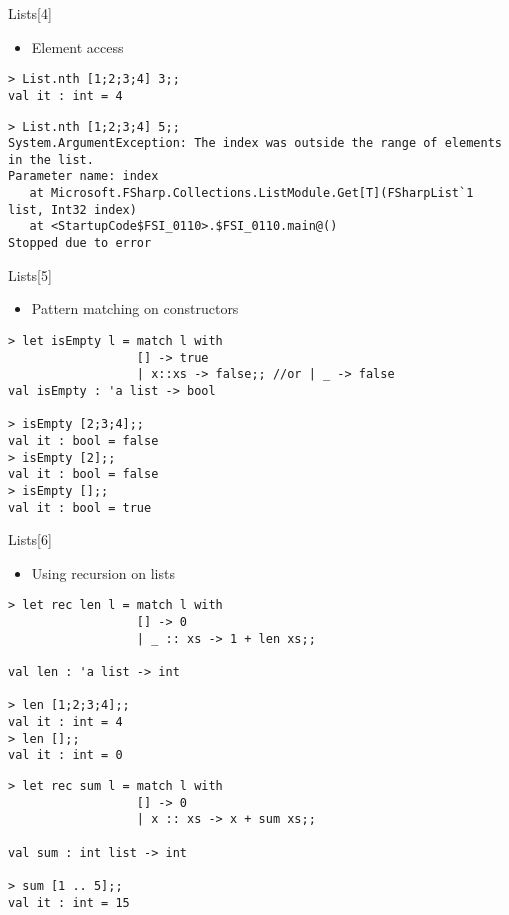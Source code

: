 \documentclass{beamer}
\begin{document}
\begin{frame}[fragile]{Lists[4]}
  \begin{itemize}
    \item Element access
  \end{itemize}
\tiny{
  \begin{verbatim}
> List.nth [1;2;3;4] 3;;
val it : int = 4
  \end{verbatim}
  \pause
  \begin{verbatim}
> List.nth [1;2;3;4] 5;;
System.ArgumentException: The index was outside the range of elements in the list.
Parameter name: index
   at Microsoft.FSharp.Collections.ListModule.Get[T](FSharpList`1 list, Int32 index)
   at <StartupCode$FSI_0110>.$FSI_0110.main@()
Stopped due to error
  \end{verbatim}
}
\end{frame}

\begin{frame}[fragile]{Lists[5]}
  \begin{itemize}
    \item Pattern matching on constructors
  \end{itemize}
  \tiny{
  \begin{verbatim}
> let isEmpty l = match l with
                  [] -> true
                  | x::xs -> false;; //or | _ -> false
val isEmpty : 'a list -> bool

> isEmpty [2;3;4];;
val it : bool = false
> isEmpty [2];;
val it : bool = false
> isEmpty [];;
val it : bool = true
  \end{verbatim}
  }
\end{frame}

\begin{frame}[fragile]{Lists[6]}
  \begin{itemize}
    \item Using recursion on lists
  \end{itemize}
\tiny{
  \begin{verbatim}
> let rec len l = match l with
                  [] -> 0
                  | _ :: xs -> 1 + len xs;;

val len : 'a list -> int

> len [1;2;3;4];;
val it : int = 4
> len [];;
val it : int = 0
  \end{verbatim}
  \pause
  \begin{verbatim}
> let rec sum l = match l with
                  [] -> 0
                  | x :: xs -> x + sum xs;;

val sum : int list -> int

> sum [1 .. 5];;
val it : int = 15
  \end{verbatim}
}
\end{frame}
\end{document}
